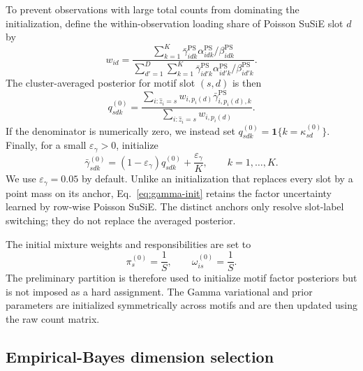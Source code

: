 \documentclass[11pt]{article}
\newcommand{\one}{\mathbf{1}}
\theoremstyle{plain}
\theoremstyle{definition}
\begin{document}
To prevent observations with large total counts from dominating the
initialization, define the within-observation loading share of Poisson SuSiE
slot $d$ by
\begin{equation}
  w_{id}
  =
  \frac{
    \sum_{k=1}^K
    \bar\gamma^{\mathrm{PS}}_{idk}
    \alpha^{\mathrm{PS}}_{idk}/\beta^{\mathrm{PS}}_{idk}
  }{
    \sum_{d'=1}^D\sum_{k=1}^K
    \bar\gamma^{\mathrm{PS}}_{id'k}
    \alpha^{\mathrm{PS}}_{id'k}/\beta^{\mathrm{PS}}_{id'k}
  }.
  \label{eq:ps-slot-weight}
\end{equation}
The cluster-averaged posterior for motif slot $(s,d)$ is then
\begin{equation}
  q_{sdk}^{(0)}
  =
  \frac{
    \sum_{i:\widehat z_i=s}
    w_{i,p_i(d)}\bar\gamma^{\mathrm{PS}}_{i,p_i(d),k}
  }{
    \sum_{i:\widehat z_i=s}w_{i,p_i(d)}
  }.
  \label{eq:aligned-ps-average}
\end{equation}
If the denominator is numerically zero, we instead set
$q_{sdk}^{(0)}=\one\{k=\kappa_{sd}^{(0)}\}$. Finally, for a small
$\varepsilon_\gamma>0$, initialize
\begin{equation}
  \bar\gamma_{sdk}^{(0)}
  =
  (1-\varepsilon_\gamma)q_{sdk}^{(0)}
  +\frac{\varepsilon_\gamma}{K},
  \qquad k=1,\ldots,K.
  \label{eq:gamma-init}
\end{equation}
We use $\varepsilon_\gamma=0.05$ by default. Unlike an initialization that
replaces every slot by a point mass on its anchor, Eq.~\eqref{eq:gamma-init}
retains the factor uncertainty learned by row-wise Poisson SuSiE. The distinct
anchors only resolve slot-label switching; they do not replace the averaged
posterior.

The initial mixture weights and responsibilities are set to
\[
  \pi_s^{(0)}=\frac{1}{S},
  \qquad
  \omega_{is}^{(0)}=\frac{1}{S}.
\]
The preliminary partition is therefore used to initialize motif factor
posteriors but is not imposed as a hard assignment. The Gamma variational and
prior parameters are initialized symmetrically across motifs and are then
updated using the raw count matrix.

\subsection{Empirical-Bayes dimension selection}
\end{document}
